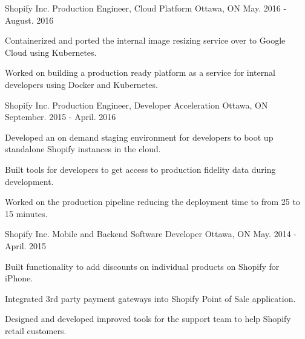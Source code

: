 

\begin{cventries}

  \cventry
    {Shopify Inc.} %
    {Production Engineer, Cloud Platform} %
    {Ottawa, ON} %
    {May. 2016 - August. 2016} %
    {
      \begin{cvitems} %
        \item {Containerized and ported the internal image resizing service over to Google Cloud using Kubernetes.}
        \item {Worked on building a production ready platform as a service for internal developers using Docker and Kubernetes.}
      \end{cvitems}
    }
    
  \cventry
    {Shopify Inc.} %
    {Production Engineer, Developer Acceleration} %
    {Ottawa, ON} %
    {September. 2015 - April. 2016} %
    {
      \begin{cvitems} %
        \item {Developed an on demand staging environment for developers to boot up standalone Shopify instances in the cloud.}
        \item {Built tools for developers to get access to production fidelity data during development.}
        \item {Worked on the production pipeline reducing the deployment time to from 25 to 15 minutes.}
      \end{cvitems}
    }

  \cventry
    {Shopify Inc.} %
    {Mobile and Backend Software Developer} %
    {Ottawa, ON} %
    {May. 2014 - April. 2015} %
    {
      \begin{cvitems} %
        \item {Built functionality to add discounts on individual products on Shopify for iPhone.}
        \item {Integrated 3rd party payment gateways into Shopify Point of Sale application.}
        \item {Designed and developed improved tools for the support team to help Shopify retail customers.}
      \end{cvitems}
    } 
    

\end{cventries}
